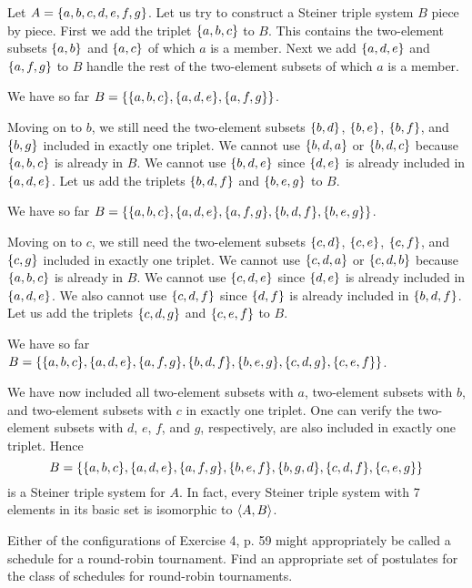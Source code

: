 \documentclass{report}
\begin{document}
\begin{solution}
Let $A=\left\{a,b,c,d,e,f,g\right\}$.
Let us try to construct a Steiner triple system $B$ piece by piece.
First we add the triplet $\left\{a,b,c\right\}$ to $B$.
This contains the two-element subsets $\left\{a,b\right\}$ and $\left\{a,c\right\}$ of which $a$ is a member.
Next we add $\left\{a,d,e\right\}$ and $\left\{a,f,g\right\}$ to $B$ handle the rest of the two-element subsets
of which $a$ is a member.

We have so far $B=\set{\set{a,b,c}, \set{a,d,e}, \set{a,f,g}}$.

Moving on to $b$, we still need the two-element subsets $\left\{b,d\right\}$, $\left\{b,e\right\}$, $\left\{b,f\right\}$, and $\left\{b,g\right\}$
included in exactly one triplet.
We cannot use $\left\{b,d,a\right\}$ or $\left\{b,d,c\right\}$ because $\left\{a,b,c\right\}$ is already in $B$.
We cannot use $\left\{b,d,e\right\}$ since $\left\{d,e\right\}$ is already included in $\left\{a,d,e\right\}$.
Let us add the triplets $\left\{b,d,f\right\}$ and $\left\{b,e,g\right\}$ to $B$.

We have so far $B=\set{\set{a,b,c}, \set{a,d,e}, \set{a,f,g}, \set{b,d,f}, \set{b,e,g}}$.

Moving on to $c$, we still need the two-element subsets $\left\{c,d\right\}$, $\left\{c,e\right\}$,
$\left\{c,f\right\}$, and $\left\{c,g\right\}$ included in exactly one triplet.
We cannot use $\left\{c,d,a\right\}$ or $\left\{c,d,b\right\}$ because $\left\{a,b,c\right\}$ is already in $B$.
We cannot use $\left\{c,d,e\right\}$ since $\left\{d,e\right\}$ is already included in $\left\{a,d,e\right\}$.
We also cannot use $\left\{c,d,f\right\}$ since $\left\{d,f\right\}$ is already included in $\left\{b,d,f\right\}$.
Let us add the triplets $\left\{c,d,g\right\}$ and $\left\{c,e,f\right\}$ to $B$.

We have so far $B=\set{\set{a,b,c}, \set{a,d,e}, \set{a,f,g}, \set{b,d,f}, \set{b,e,g}, \set{c,d,g}, \set{c,e,f}}$.

We have now included all two-element subsets with $a$, two-element subsets with $b$, and two-element subsets with $c$
in exactly one triplet. One can verify the two-element subsets with $d$, $e$, $f$, and $g$, respectively,
are also included in exactly one triplet. Hence
\[B=\set{\set{a,b,c}, \set{a,d,e}, \set{a,f,g}, \set{b,e,f}, \set{b,g,d}, \set{c,d,f}, \set{c,e,g}}\]
is a Steiner triple system for $A$.
In fact, every Steiner triple system with 7 elements in its basic set is isomorphic to $\left\langle A, B\right\rangle$.
\end{solution}

\begin{exercise}
Either of the configurations of Exercise 4, p. 59 might appropriately be called a
schedule for a round-robin tournament. Find an appropriate set of postulates for the
class of schedules for round-robin tournaments.
\end{exercise}
\end{document}
